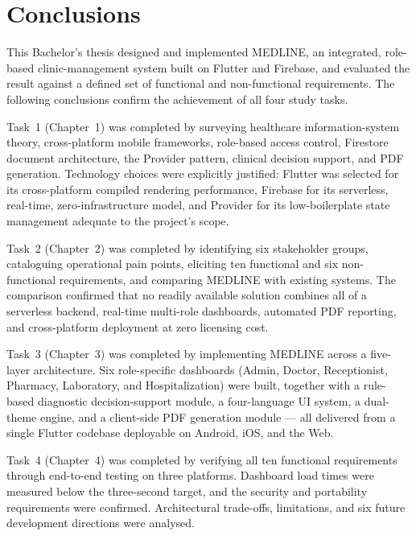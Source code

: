 \documentclass[12pt,a4paper,oneside]{report}
\begin{document}
\chapter*{Conclusions}

This Bachelor's thesis designed and implemented MEDLINE, an integrated,
role-based clinic-management system built on Flutter and Firebase, and evaluated
the result against a defined set of functional and non-functional requirements.
The following conclusions confirm the achievement of all four study tasks.

Task~1 (Chapter~1) was completed by surveying healthcare information-system
theory, cross-platform mobile frameworks, role-based access control, Firestore
document architecture, the Provider pattern, clinical decision support, and PDF
generation. Technology choices were explicitly justified: Flutter was selected
for its cross-platform compiled rendering performance, Firebase for its
serverless, real-time, zero-infrastructure model, and Provider for its
low-boilerplate state management adequate to the project's scope.

Task~2 (Chapter~2) was completed by identifying six stakeholder groups,
cataloguing operational pain points, eliciting ten functional and six
non-functional requirements, and comparing MEDLINE with existing systems. The
comparison confirmed that no readily available solution combines all of a
serverless backend, real-time multi-role dashboards, automated PDF reporting,
and cross-platform deployment at zero licensing cost.

Task~3 (Chapter~3) was completed by implementing MEDLINE across a five-layer
architecture. Six role-specific dashboards (Admin, Doctor, Receptionist,
Pharmacy, Laboratory, and Hospitalization) were built, together with a
rule-based diagnostic decision-support module, a four-language UI system, a
dual-theme engine, and a client-side PDF generation module --- all delivered
from a single Flutter codebase deployable on Android, iOS, and the Web.

Task~4 (Chapter~4) was completed by verifying all ten functional requirements
through end-to-end testing on three platforms. Dashboard load times were
measured below the three-second target, and the security and portability
requirements were confirmed. Architectural trade-offs, limitations, and six
future development directions were analysed.
\end{document}
